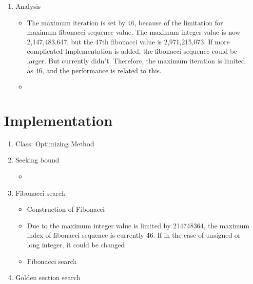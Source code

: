 \documentclass[12pt,letterpaper]{article}
\begin{document}
\begin{enumerate}
\item Analysis
\begin{itemize}
\item The maximum iteration is set by 46, because of the limitation for maximum fibonacci sequence value.
The maximum integer value is now 2,147,483,647, but the 47th fibonacci value is 2,971,215,073. 
If more complicated Implementation is added, the fibonacci sequence could be larger. But currently didn't.
Therefore, the maximum iteration is limited as 46, and the performance is related to this.
\item 

\end{itemize}
\end{enumerate}

\newpage
\section*{Implementation}

\begin{enumerate}

\item Class: Optimizing Method


\item Seeking bound
\begin{itemize}
  \item 
\end{itemize}

\item Fibonacci search
\begin{itemize}
  \item Construction of Fibonacci
  \item Due to the maximum integer value is limited by 214748364, the maximum index of fibonacci sequence is currently 46. If in the case of unsigned or long integer, it could be changed
\end{itemize}
\begin{itemize}
  \item Fibonacci search
\end{itemize}

\newpage

\item Golden section search

\end{enumerate}
\end{document}
